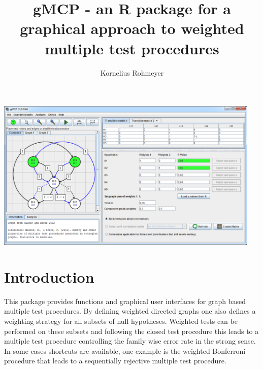 \documentclass[a4paper, 10pt]{article}\usepackage[]{graphicx}\usepackage[]{color}
\numberwithin{equation}{section}
\theoremstyle{definition}
\theoremstyle{plain}
\begin{document}

\title{gMCP - an R package for a graphical approach to weighted multiple test procedures} 

\author{Kornelius Rohmeyer}

\maketitle\thispagestyle{empty}\vspace*{1cm}

\begin{center}
  \includegraphics[width=0.95\textwidth]{pictures/entangled.png}\\[0.4cm]
\end{center}

\newpage

\tableofcontents




\newpage

\section{Introduction}

This package provides functions and graphical user interfaces for
graph based multiple test procedures. By defining weighted directed graphs one
also defines a weighting strategy for all subsets of null hypotheses.
Weighted tests can be performed on these subsets and following the
closed test procedure this leads to a multiple test procedure
controlling the family wise error rate in the strong sense. In some
cases shortcuts are available, one example is the weighted Bonferroni
procedure that leads to a sequentially rejective multiple test procedure.
\end{document}
